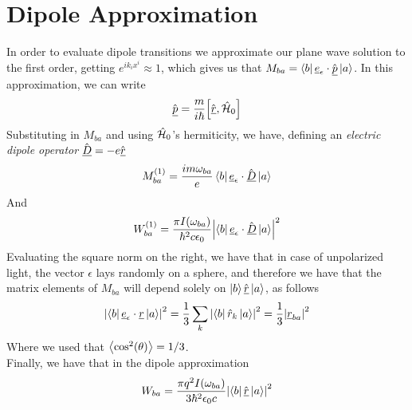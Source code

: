 \documentclass[../qm.tex]{subfiles}
\begin{document}
	\section{Dipole Approximation}
	In order to evaluate dipole transitions we approximate our plane wave solution to the first order, getting $e^{ik_ix^i}\approx1$, which gives us that $M_{ba}=\bra{b}\underline{e}_{\epsilon}\cdot\hat{\underline{p}}\ket{a}$. In this approximation, we can write
	\begin{equation*}
		\vecopr{p}=\frac{m}{i\hbar}\comm{\vecopr{r}}{\opr{\ham}_0}
	\end{equation*}
	Substituting in $M_{ba}$ and using $\hat{\mathcal{H}}_0$'s hermiticity, we have, defining an \textit{electric dipole operator} $\hat{\underline{D}}=-e\hat{\underline{r}}$
	\begin{equation}
		M_{ba}^{(1)}=\frac{im\omega_{ba}}{e}\bra{b}\underline{e}_{\epsilon}\cdot\hat{\underline{D}}\ket{a}
		\label{eq:mbadipole}
	\end{equation}
	And
	\begin{equation}
		W_{ba}^{(1)}=\frac{\pi I(\omega_{ba})}{\hbar^2c\epsilon_0}\abs{\bra{b}\underline{e}_{\epsilon}\cdot\hat{\underline{D}}\ket{a}}^2
		\label{eq:transprobdipole}
	\end{equation}
	Evaluating the square norm on the right, we have that in case of unpolarized light, the vector $\epsilon$ lays randomly on a sphere, and therefore we have that the matrix elements of $M_{ba}$ will depend solely on $\ket{b}\hat{\underline{r}}\ket{a}$, as follows
	\begin{equation}
		\abs{\bra{b}\underline{e}_{\epsilon}\cdot\underline{r}\ket{a}}^2=\frac{1}{3}\sum_k\abs{\bra{b}\hat{r}_k\ket{a}}^2=\frac{1}{3}\abs{\underline{r}_{ba}}^2
		\label{eq:mbadipoletransunpol}
	\end{equation}
	Where we used that $\expval{\cos^2(\theta)}=1/3$.\\
	Finally, we have that in the dipole approximation
	\begin{equation}
		W_{ba}=\frac{\pi q^2I(\omega_{ba})}{3\hbar^2\epsilon_0c}\abs{\bra{b}\hat{\underline{r}}\ket{a}}^2
		\label{eq:wbadipole}
	\end{equation}
\end{document}

